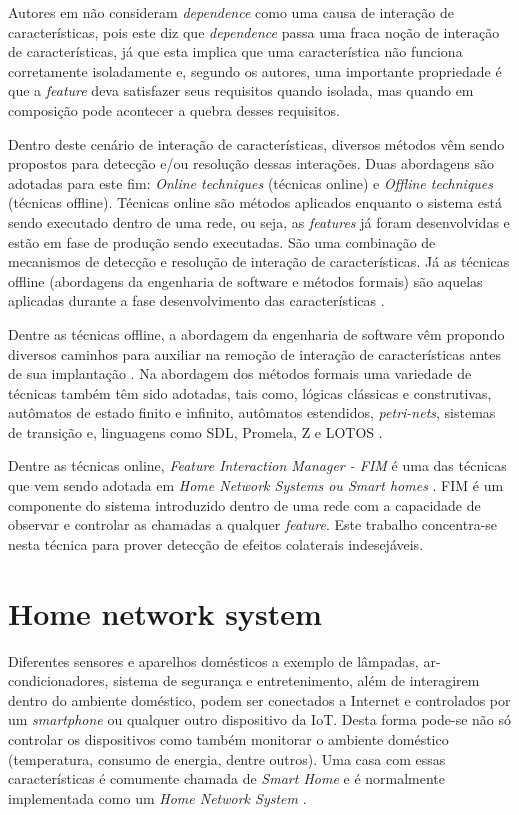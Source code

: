 Autores em \cite{NHLABATSI:2008} não consideram \textit{dependence} como uma causa de interação de características, pois este diz que \textit{dependence} passa uma fraca noção de interação de características, já que esta implica que uma característica não funciona corretamente isoladamente e, segundo os autores, uma importante propriedade é que a \textit{feature} deva satisfazer seus requisitos quando isolada, mas quando em composição pode acontecer a quebra desses requisitos.

Dentro deste cenário de interação de características, diversos métodos vêm sendo propostos para detecção e/ou resolução dessas interações. Duas abordagens são adotadas para este fim: \textit{Online techniques} (técnicas online) e \textit{Offline techniques} (técnicas offline). Técnicas online são métodos aplicados enquanto o sistema está sendo executado dentro de uma rede, ou seja, as \textit{features} já foram desenvolvidas e estão em fase de produção sendo executadas. São uma combinação de mecanismos de detecção e resolução de interação de características. Já as técnicas offline (abordagens da engenharia de software e métodos formais) são aquelas aplicadas durante a fase desenvolvimento das características \cite{Calder:2003}.

Dentre as técnicas offline, a abordagem da engenharia de software vêm propondo diversos caminhos \cite{Thum:2014, Siegmund:2012, Siegmund2012} para auxiliar na remoção de interação de características antes de sua implantação \cite{Calder:2003}. Na abordagem dos métodos formais \cite{Almeida:2011} uma variedade de técnicas também têm sido adotadas, tais como, lógicas clássicas e construtivas, autômatos de estado finito e infinito, autômatos estendidos, \textit{petri-nets}, sistemas de transição e, linguagens como SDL, Promela, Z e LOTOS \cite{Calder:2003}.

Dentre as técnicas online, \textit{Feature Interaction Manager - FIM} é uma das técnicas que vem sendo adotada em \textit{Home Network Systems ou Smart homes} \cite{Wilson:2005, Wilson:2008, Nakamura:2009}. FIM \cite{Calder:2003} é um componente do sistema introduzido dentro de uma rede com a capacidade de observar e controlar as chamadas a qualquer \textit{feature}. Este trabalho concentra-se nesta técnica para prover detecção de efeitos colaterais indesejáveis.

\section{Home network system}
\label{sec:hns}
Diferentes sensores e aparelhos domésticos a exemplo de lâmpadas, ar-condicionadores, sistema de segurança e entretenimento, além de interagirem dentro do ambiente doméstico, podem ser conectados a Internet e controlados por um \textit{smartphone} ou qualquer outro dispositivo da IoT. Desta forma pode-se não só controlar os dispositivos como também monitorar o ambiente doméstico (temperatura, consumo de energia, dentre outros). Uma casa com essas características é comumente chamada de \textit{Smart Home} e é normalmente implementada como um \textit{Home Network System} \cite{Piyare:2013}.

